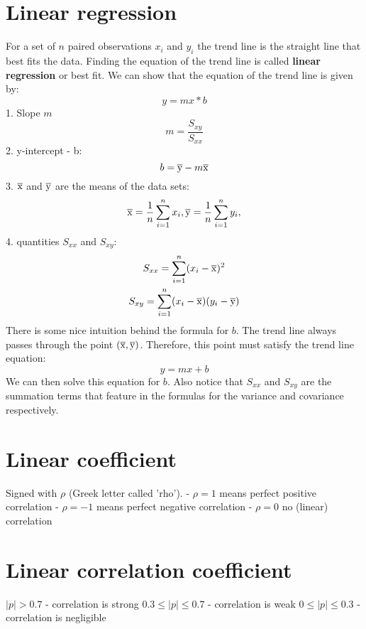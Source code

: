 \documentclass{article}
\begin{document}
\section{Linear regression}
For a set of $n$ paired observations $x_i$ and $y_i$ the trend line is the
straight line that best fits the data.
Finding the equation of the trend line is called \textbf{linear regression}
or best fit.
We can show that the equation of the trend line is given by:
\begin{equation}
  y = mx * b
\end{equation}
1. Slope $m$
\begin{equation}
  m = \frac{S_{xy}}{S_{xx}}
\end{equation}
2. y-intercept - b:
\begin{equation}
  b = \overline{\rm y} - m\overline{\rm x}
\end{equation}
3. $\overline{\rm x}$ and $\overline{\rm y}$ are the means of the data sets:
\begin{equation}
  \overline{\rm x} = \frac{1}{n} \sum_{i=1}^nx_i, \overline{\rm y} = \frac{1}{n} \sum_{i=1}^ny_i,
\end{equation}
4. quantities $S_{xx}$ and $S_{xy}$:
\begin{equation}
  \begin{gathered}
    S_{xx} = \sum_{i=1}^n (x_i - \overline{\rm x})^2 \\
    S_{xy} = \sum_{i=1}^n(x_i - \overline{\rm x})(y_i - \overline{\rm y})
  \end{gathered}
\end{equation}
There is some nice intuition behind the formula for $b$. The trend line
always passes through the point $(\overline{\rm x}, \overline{\rm y})$.
Therefore, this point must satisfy the trend line equation:
\begin{equation}
  y = mx + b
\end{equation}
We can then solve this equation for $b$. Also notice that $S_{xx}$ and $S_{xy}$
are the summation terms that feature in the formulas for the variance and
covariance respectively.
\section{Linear coefficient}
Signed with $\rho$ (Greek letter called 'rho').
- $\rho = 1$ means perfect positive correlation
- $\rho = -1$ means perfect negative correlation
- $\rho = 0$ no (linear) correlation
\section{Linear correlation coefficient}
$|p| > 0.7$ - correlation is strong
$0.3 \leqslant |p| \leqslant 0.7$ - correlation is weak
$0 \leqslant |p| \leqslant 0.3$ - correlation is negligible
\end{document}
